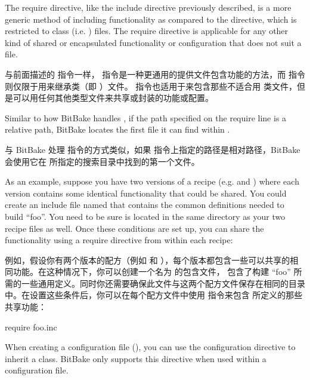 The require directive, like the include directive previously described, is a more generic method of including functionality as compared to the  directive, which is restricted to class (i.e. ) files. The require directive is applicable for any other kind of shared or encapsulated functionality or configuration that does not suit a  file.

与前面描述的  指令一样， 指令是一种更通用的提供文件包含功能的方法，而  指令则仅限于用来继承类（即 ）文件。 指令也适用于来包含那些不适合用  类文件，但是可以用任何其他类型文件来共享或封装的功能或配置。

Similar to how BitBake handles , if the path specified on the require line is a relative path, BitBake locates the first file it can find within .

与 BitBake 处理  指令的方式类似，如果  指令上指定的路径是相对路径，BitBake 会使用它在  所指定的搜索目录中找到的第一个文件。

As an example, suppose you have two versions of a recipe (e.g.  and ) where each version contains some identical functionality that could be shared. You could create an include file named  that contains the common definitions needed to build ``foo''. You need to be sure  is located in the same directory as your two recipe files as well. Once these conditions are set up, you can share the functionality using a require directive from within each recipe:

例如，假设你有两个版本的配方（例如  和 ），每个版本都包含一些可以共享的相同功能。在这种情况下，你可以创建一个名为  的包含文件， 包含了构建 ``foo'' 所需的一些通用定义。同时你还需要确保此文件与这两个配方文件保存在相同的目录中。在设置这些条件后，你可以在每个配方文件中使用  指令来包含  所定义的那些共享功能：

\begin{pyglist}
require foo.inc
\end{pyglist}

\label{section:INHERIT Configuration Directive}

When creating a configuration file (), you can use the  configuration directive to inherit a class. BitBake only supports this directive when used within a configuration file.

